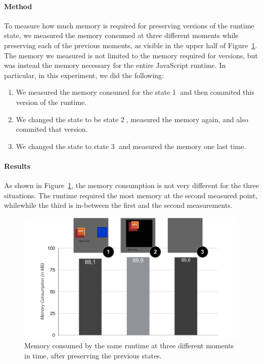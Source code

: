 \paragraph{Method}
To measure how much memory is required for preserving versions of the runtime state, we measured the memory consumed at three different moments while preserving each of the previous moments, as visible in the upper half of Figure~\ref{fig:MemoryOverheadForVersions}.
The memory we measured is not limited to the memory required for versions, but was instead the memory necessary for the entire JavaScript runtime.
In particular, in this experiment, we did the following:
\begin{enumerate}
    \item We measured the memory consumed for the state \textcircled{1} and then commited this version of the runtime.
    \item We changed the state to be state \textcircled{2}, measured the memory again, and also commited that version.
    \item We changed the state to state \textcircled{3} and measured the memory one last time.
\end{enumerate}

\paragraph{Results}
As shown in Figure~\ref{fig:MemoryOverheadForVersions}, the memory consumption is not very different for the three situations.
The runtime required the most memory at the second measured point, whilewhile the third is in-between the first and the second measurements.

\begin{figure}[h]
    \centering
    \includegraphics[width=\textwidth]{figures/6_evaluation/2_memoryForVersions.pdf}
    \caption{Memory consumed by the same runtime at three different moments in time, after preserving the previous states.}
    \label{fig:MemoryOverheadForVersions}
\end{figure}


